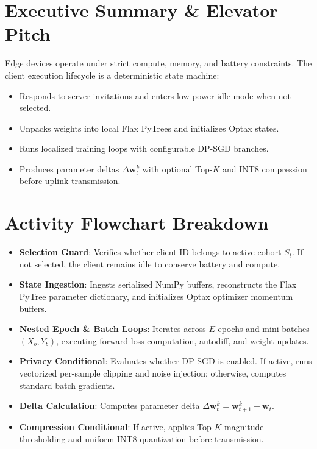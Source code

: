 \documentclass[11pt,a4paper,titlepage]{report}
\begin{document}
\section{Executive Summary \& Elevator Pitch}
\begin{elevatorpitch}
Edge devices operate under strict compute, memory, and battery constraints. The client execution lifecycle is a deterministic state machine:
\begin{itemize}[leftmargin=*]
    \item Responds to server invitations and enters low-power idle mode when not selected.
    \item Unpacks weights into local Flax PyTrees and initializes Optax states.
    \item Runs localized training loops with configurable DP-SGD branches.
    \item Produces parameter deltas $\Delta\mathbf{w}_t^k$ with optional Top-$K$ and INT8 compression before uplink transmission.
\end{itemize}
\end{elevatorpitch}

\section{Activity Flowchart Breakdown}
\begin{itemize}[leftmargin=*]
    \item \textbf{Selection Guard}: Verifies whether client ID belongs to active cohort $S_t$. If not selected, the client remains idle to conserve battery and compute.
    \item \textbf{State Ingestion}: Ingests serialized NumPy buffers, reconstructs the Flax PyTree parameter dictionary, and initializes Optax optimizer momentum buffers.
    \item \textbf{Nested Epoch \& Batch Loops}: Iterates across $E$ epochs and mini-batches $(X_b, Y_b)$, executing forward loss computation, autodiff, and weight updates.
    \item \textbf{Privacy Conditional}: Evaluates whether DP-SGD is enabled. If active, runs vectorized per-sample clipping and noise injection; otherwise, computes standard batch gradients.
    \item \textbf{Delta Calculation}: Computes parameter delta $\Delta\mathbf{w}_t^k = \mathbf{w}_{t+1}^k - \mathbf{w}_t$.
    \item \textbf{Compression Conditional}: If active, applies Top-$K$ magnitude thresholding and uniform INT8 quantization before transmission.
\end{itemize}
\end{document}
